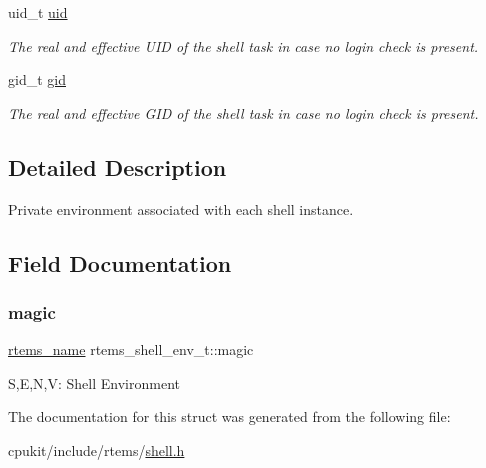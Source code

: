 \begin{DoxyCompactItemize}
uid\+\_\+t \mbox{\hyperlink{structrtems__shell__env__t_a8ddca8288b4126932ef7414fa7861c32}{uid}}
\begin{DoxyCompactList}\small\item\em The real and effective U\+ID of the shell task in case no login check is present. \end{DoxyCompactList}\item 
\mbox{\label{structrtems__shell__env__t_a160b27592247b786da46f6505ace4adb}} 
gid\+\_\+t \mbox{\hyperlink{structrtems__shell__env__t_a160b27592247b786da46f6505ace4adb}{gid}}
\begin{DoxyCompactList}\small\item\em The real and effective G\+ID of the shell task in case no login check is present. \end{DoxyCompactList}\end{DoxyCompactItemize}


\subsection{Detailed Description}
Private environment associated with each shell instance. 

\subsection{Field Documentation}
\mbox{\label{structrtems__shell__env__t_a93086f7e4eb4ef1bb78b0e0da3a58eba}} 
\subsubsection{\texorpdfstring{magic}{magic}}
{\footnotesize\ttfamily \mbox{\hyperlink{group__ClassicTasks_ga55fb63c49f68c0cbd9bee004da15b1fd}{rtems\+\_\+name}} rtems\+\_\+shell\+\_\+env\+\_\+t\+::magic}

\textquotesingle{}S\textquotesingle{},\textquotesingle{}E\textquotesingle{},\textquotesingle{}N\textquotesingle{},\textquotesingle{}V\textquotesingle{}\+: Shell Environment 

The documentation for this struct was generated from the following file\+:\begin{DoxyCompactItemize}
\item 
cpukit/include/rtems/\mbox{\hyperlink{shell_8h}{shell.\+h}}\end{DoxyCompactItemize}
